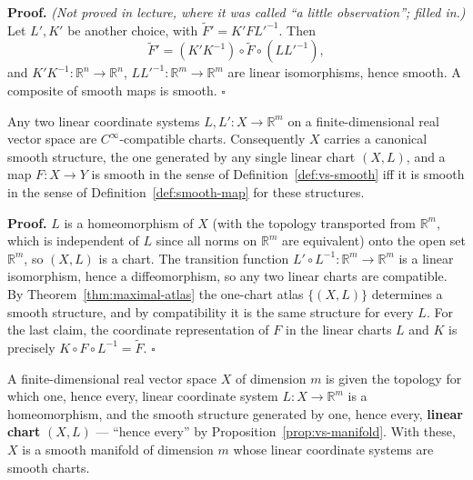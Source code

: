 \documentclass[11pt]{report}
\makeatletter
\newcounter{defcounter}[section]
\newcounter{thmcounter}[section]
\renewenvironment{proof}[1][Proof]{\noindent\textbf{#1.} }{\hfill$\square$\par\vspace{5pt}}
\newcommand{\thmlabel}[1]{\edef\@currentlabel{\arabic{section}.\arabic{thmcounter}}\label{#1}}
\newcommand{\deflabel}[1]{\edef\@currentlabel{\arabic{section}.\arabic{defcounter}}\label{#1}}
\newcommand{\leeref}[1]{\par\smallskip{\raggedleft\footnotesize\textsc{Lee}:\ #1\par}}
\makeatother
\begin{document}
\begin{proof}
\textit{(Not proved in lecture, where it was called ``a little observation''; filled in.)} Let $L', K'$ be another choice, with $\widetilde F' = K' F L'^{-1}$. Then
\[
\widetilde F' = (K' K^{-1}) \circ \widetilde F \circ (L L'^{-1}),
\]
and $K'K^{-1} : \mathbb{R}^n \to \mathbb{R}^n$, $LL'^{-1} : \mathbb{R}^m \to \mathbb{R}^m$ are linear isomorphisms, hence smooth. A composite of smooth maps is smooth.
\end{proof}

\begin{propbox}\thmlabel{prop:vs-manifold}
Any two linear coordinate systems $L, L' : X \to \mathbb{R}^m$ on a finite-dimensional real vector space are $C^\infty$-compatible charts. Consequently $X$ carries a canonical smooth structure, the one generated by any single linear chart $(X, L)$, and a map $F : X \to Y$ is smooth in the sense of Definition~\ref{def:vs-smooth} iff it is smooth in the sense of Definition~\ref{def:smooth-map} for these structures.
\leeref{Example 1.24}
\end{propbox}

\begin{proof}
$L$ is a homeomorphism of $X$ (with the topology transported from $\mathbb{R}^m$, which is independent of $L$ since all norms on $\mathbb{R}^m$ are equivalent) onto the open set $\mathbb{R}^m$, so $(X, L)$ is a chart. The transition function $L' \circ L^{-1} : \mathbb{R}^m \to \mathbb{R}^m$ is a linear isomorphism, hence a diffeomorphism, so any two linear charts are compatible. By Theorem~\ref{thm:maximal-atlas} the one-chart atlas $\{(X,L)\}$ determines a smooth structure, and by compatibility it is the same structure for every $L$. For the last claim, the coordinate representation of $F$ in the linear charts $L$ and $K$ is precisely $K \circ F \circ L^{-1} = \widetilde F$.
\end{proof}

\begin{defbox}\deflabel{def:vs-structure}
A finite-dimensional real vector space $X$ of dimension $m$ is given the topology for which one, hence every, linear coordinate system $L : X \to \mathbb{R}^m$ is a homeomorphism, and the smooth structure generated by one, hence every, \textbf{linear chart} $(X, L)$ --- ``hence every'' by Proposition~\ref{prop:vs-manifold}. With these, $X$ is a smooth manifold of dimension $m$ whose linear coordinate systems are smooth charts.
\leeref{Example 1.24}
\end{defbox}
\end{document}
